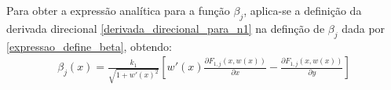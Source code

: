 %

Para obter a expressão analítica para a função $\beta_j$, aplica-se a definição da derivada direcional \eqref{derivada_direcional_para_n1} na definção de $\beta_j$ dada por \eqref{expressao_define_beta}, obtendo:
\begin{align}
\beta_j(x) = \frac{k_1}{\sqrt{1 + w'(x)^2}}\left[w'(x)\frac{\partial F_{1, j}(x, w(x))}{\partial x} - \frac{\partial F_{1, j}(x, w(x))}{\partial y}\right] \label{expansao_beta}
\end{align}

